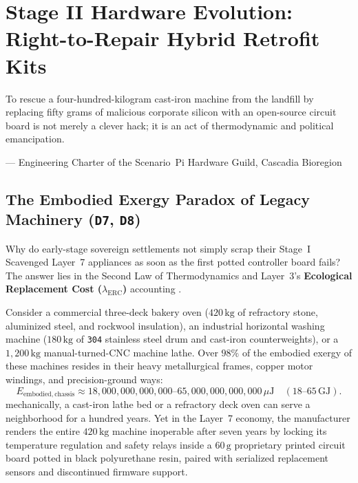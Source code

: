 \chapter{Stage II Hardware Evolution: Right-to-Repair Hybrid Retrofit Kits}
\label{ch:stage2-right-to-repair-retrofits}

\epigraph{To rescue a four-hundred-kilogram cast-iron machine from the landfill by replacing fifty grams of malicious corporate silicon with an open-source circuit board is not merely a clever hack; it is an act of thermodynamic and political emancipation.}{--- Engineering Charter of the Scenario~Pi Hardware Guild, Cascadia Bioregion}

\section{The Embodied Exergy Paradox of Legacy Machinery (\texttt{D7}, \texttt{D8})}
\label{sec:l2-stage2-embodied-exergy}

Why do early-stage sovereign settlements not simply scrap their Stage~I Scavenged Layer~7 appliances as soon as the first potted controller board fails? The answer lies in the Second Law of Thermodynamics and Layer~3's \textbf{Ecological Replacement Cost ($\lambda_{\mathrm{ERC}}$)} accounting \parencite{georgescu1971,odum1971}.

Consider a commercial three-deck bakery oven ($420\,\mathrm{kg}$ of refractory stone, aluminized steel, and rockwool insulation), an industrial horizontal washing machine ($180\,\mathrm{kg}$ of \texttt{304} stainless steel drum and cast-iron counterweights), or a $1{,}200\,\mathrm{kg}$ manual-turned-CNC machine lathe. Over $98\%$ of the embodied exergy of these machines resides in their heavy metallurgical frames, copper motor windings, and precision-ground ways:
\begin{equation}
    E_{\mathrm{embodied,chassis}} \approx 18{,}000{,}000{,}000{,}000\text{--}65{,}000{,}000{,}000{,}000\,\mu\mathrm{J} \quad (18\text{--}65\,\mathrm{GJ}).
    \label{eq:l2-chassis-embodied-exergy}
\end{equation}
 mechanically, a cast-iron lathe bed or a refractory deck oven can serve a neighborhood for a hundred years. Yet in the Layer~7 economy, the manufacturer renders the entire $420\,\mathrm{kg}$ machine inoperable after seven years by locking its temperature regulation and safety relays inside a $60\,\mathrm{g}$ proprietary printed circuit board potted in black polyurethane resin, paired with serialized replacement sensors and discontinued firmware support.

